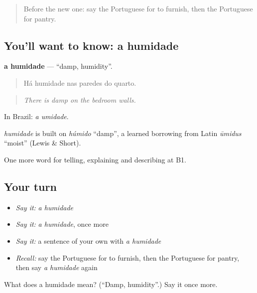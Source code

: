 \begin{quote}
Before the new one: say the Portuguese for to furnish, then the Portuguese for pantry.
\end{quote}

\subsection*{You'll want to know: a humidade}
\textbf{a humidade} — \textquotedblleft{}damp, humidity\textquotedblright{}.

\begin{quote}
Há humidade nas paredes do quarto.
\end{quote}

\begin{quote}
\emph{There is damp on the bedroom walls.}
\end{quote}

In Brazil: \emph{a umidade}.

\begin{cousinweb}
\emph{humidade} is built on \emph{húmido} \textquotedblleft{}damp\textquotedblright{}, a learned borrowing from Latin \emph{ūmidus} \textquotedblleft{}moist\textquotedblright{} (Lewis \& Short).
\end{cousinweb}

\begin{grammarlens}[title={What you've built}]
One more word for telling, explaining and describing at B1.
\end{grammarlens}

\subsection*{Your turn}
\begin{itemize}
\raggedright
  \item \emph{Say it:} \emph{a humidade}
  \item \emph{Say it:} \emph{a humidade}, once more
  \item \emph{Say it:} a sentence of your own with \emph{a humidade}
  \item \emph{Recall:} say the Portuguese for to furnish, then the Portuguese for pantry, then say \emph{a humidade} again
\end{itemize}

\begin{tcolorbox}[breakable,colback=teal!4,colframe=teal!35!black,title={Before you move on}]
What does a humidade mean? (\textquotedblleft{}Damp, humidity\textquotedblright{}.) Say it once more.
\end{tcolorbox}

